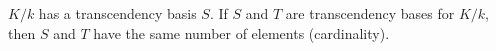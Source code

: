 $K/k$ has a transcendency basis $S$. If $S$ and $T$ are transcendency bases for $K/k$, then $S$ and $T$ have the same number of elements (cardinality).
